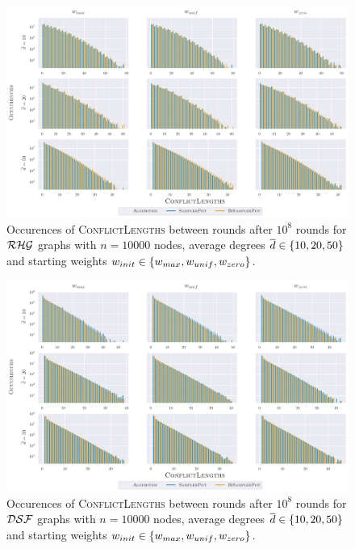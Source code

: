 \begin{figure}
  \centering
  \includegraphics[width=\textwidth]{Figures/experiments/Conflicts_Rhg.pdf}
  \caption{
    Occurences of \textsc{ConflictLengths} between rounds after $10^8$ rounds for $\mathcal{RHG}$ graphs with $n = 10000$ nodes, average degrees $\overline{d} \in \left\{10, 20, 50\right\}$ and starting weights $w_{init} \in \left\{w_{max}, w_{unif}, w_{zero}\right\}$.
  }
  \label{fig:app_conflicts_rhg}
\end{figure}

\begin{figure}
  \centering
  \includegraphics[width=\textwidth]{Figures/experiments/Conflicts_Dsf.pdf}
  \caption{
    Occurences of \textsc{ConflictLengths} between rounds after $10^8$ rounds for $\mathcal{DSF}$ graphs with $n = 10000$ nodes, average degrees $\overline{d} \in \left\{10, 20, 50\right\}$ and starting weights $w_{init} \in \left\{w_{max}, w_{unif}, w_{zero}\right\}$.
  }
  \label{fig:app_conflicts_dsf}
\end{figure}

